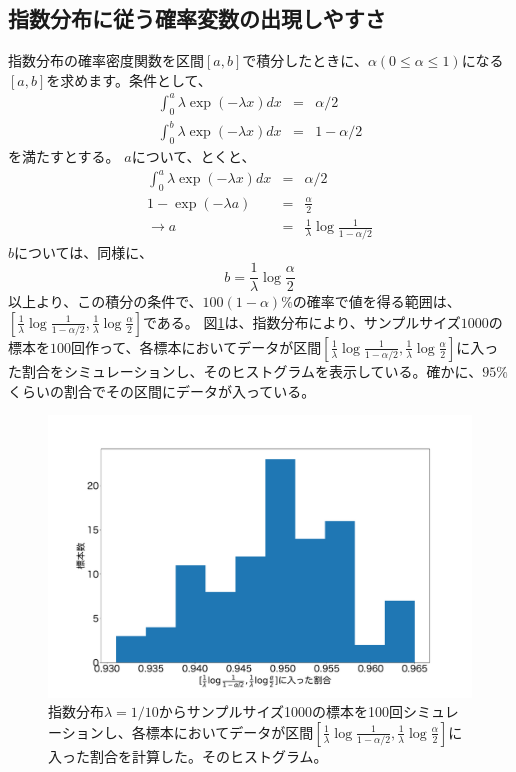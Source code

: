\subsection{指数分布に従う確率変数の出現しやすさ}
指数分布の確率密度関数を区間$[a,b]$で積分したときに、$\alpha(0\leq \alpha \leq 1)$になる$[a,b]$を求めます。条件として、
\begin{eqnarray*}
    \int_0^{a}  \lambda\exp(-\lambda x )dx &=& \alpha/2\\
    \int_0^{b} \lambda\exp(-\lambda x )dx &=& 1-\alpha/2
\end{eqnarray*}
を満たすとする。
$a$について、とくと、
\begin{eqnarray*}
    \int_0^{a}  \lambda\exp(-\lambda x )dx &=& \alpha/2\\
     1-\exp(-\lambda a) &=& \frac{\alpha}{2}\\
     \rightarrow a&=& \frac{1}{\lambda} \log\frac{1}{1-\alpha/2}
\end{eqnarray*}
$b$については、同様に、
\begin{equation*}
    b = \frac{1}{\lambda}\log\frac{\alpha}{2}
\end{equation*}
以上より、この積分の条件で、$100(1-\alpha)\%$の確率で値を得る範囲は、$[\frac{1}{\lambda} \log\frac{1}{1-\alpha/2} ,\frac{1}{\lambda}\log\frac{\alpha}{2}]$である。
図\ref{fig:expon_simulation_sample}は、指数分布により、サンプルサイズ$1000$の標本を$100$回作って、各標本においてデータが区間$[\frac{1}{\lambda} \log\frac{1}{1-\alpha/2} ,\frac{1}{\lambda}\log\frac{\alpha}{2}]$に入った割合をシミュレーションし、そのヒストグラムを表示している。確かに、$95\%$くらいの割合でその区間にデータが入っている。


\begin{figure}
    \begin{center}
        \includegraphics[width=15cm]{./image/02_/expon_simulation_sample.pdf}
        \caption{指数分布$\lambda=1/10$からサンプルサイズ1000の標本を100回シミュレーションし、各標本においてデータが区間$[\frac{1}{\lambda} \log\frac{1}{1-\alpha/2} ,\frac{1}{\lambda}\log\frac{\alpha}{2}]$に入った割合を計算した。そのヒストグラム。}
        \label{fig:expon_simulation_sample}

    \end{center}
\end{figure}


